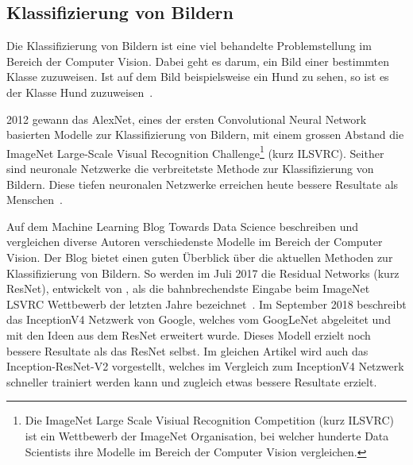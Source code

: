 

\newpage
\subsection{Klassifizierung von Bildern}
\label{chap:image-classification}

Die Klassifizierung von Bildern ist eine viel behandelte Problemstellung im Bereich der Computer Vision. Dabei geht es darum, ein Bild einer bestimmten Klasse zuzuweisen. Ist auf dem Bild beispielsweise ein Hund zu sehen, so ist es der Klasse Hund zuzuweisen~\autocite{Goodfellow2016}.

2012 gewann das AlexNet, eines der ersten Convolutional Neural Network basierten Modelle zur Klassifizierung von Bildern, mit einem grossen Abstand die ImageNet Large-Scale Visual Recognition Challenge\footnote{Die ImageNet Large Scale Visiual Recognition Competition (kurz ILSVRC) ist ein Wettbewerb der ImageNet Organisation, bei welcher hunderte Data Scientists ihre Modelle im Bereich der Computer Vision vergleichen.} (kurz ILSVRC). Seither sind neuronale Netzwerke die verbreitetste Methode zur Klassifizierung von Bildern. Diese tiefen neuronalen Netzwerke erreichen heute bessere Resultate als Menschen~\autocite{SSD}.

Auf dem Machine Learning Blog Towards Data Science beschreiben und vergleichen diverse Autoren verschiedenste Modelle im Bereich der Computer Vision. Der Blog bietet einen guten Überblick über die aktuellen Methoden zur Klassifizierung von Bildern. So werden im Juli 2017 die Residual Networks (kurz ResNet), entwickelt von \textcite{He2015}, als die bahnbrechendste Eingabe beim ImageNet LSVRC Wettbewerb der letzten Jahre bezeichnet~\autocite{Fungg2017ResNet}. Im September 2018 beschreibt \textcite{SHTsuang2018Inception} das InceptionV4 Netzwerk von Google, welches vom GoogLeNet abgeleitet und mit den Ideen aus dem ResNet erweitert wurde. Dieses Modell erzielt noch bessere Resultate als das ResNet selbst. Im gleichen Artikel wird auch das Inception-ResNet-V2 vorgestellt, welches im Vergleich zum InceptionV4 Netzwerk schneller trainiert werden kann und zugleich etwas bessere Resultate erzielt. 

